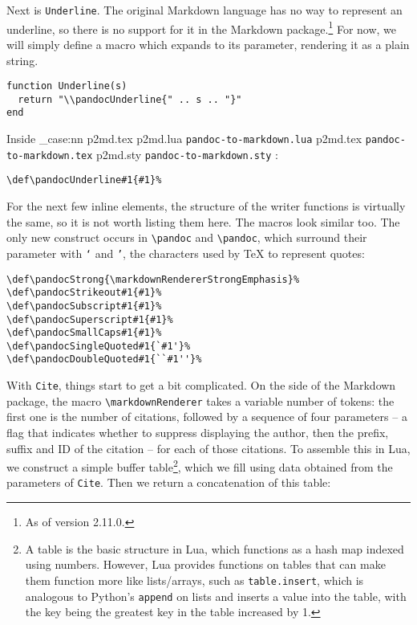 \documentclass[
  digital,     %
  oneside,     %
  nosansbold,  %
  nocolorbold, %
  lof,         %
  nolot,       %
]{fithesis4}
\newcommand\macro[1]{\texttt{\textbackslash{}{#1}}}
\newcommand\pandoc[1]{\macro{pandoc\-{#1}}}
\newcommand\renderer[1]{\macro{markdown\-Renderer\-{#1}}}
\newcommand\file[1]
  {
    \str_case:nn
      { #1 }
      {
        { p2md.lua } { \texttt{pandoc\hyp{}to\hyp{}markdown.lua} }
        { p2md.tex } { \texttt{pandoc\hyp{}to\hyp{}markdown.tex} }
        { p2md.sty } { \texttt{pandoc\hyp{}to\hyp{}markdown.sty} }
      }
  }
\begin{document}
\noindent
Next is \texttt{Underline}. The original Markdown language has no way to represent an underline, so there is no support for it in the Markdown package.\footnote{As of version 2.11.0.} For now, we will simply define a macro which expands to its parameter, rendering it as a plain string.

\noindent
\lstset{language=[5.3]Lua}
\begin{lstlisting}
function Underline(s)
  return "\\pandocUnderline{" .. s .. "}"
end
\end{lstlisting}

\noindent
Inside \file{p2md.tex}:

\noindent
\lstset{language=[plain]TeX}
\begin{lstlisting}
\def\pandocUnderline#1{#1}%
\end{lstlisting}

\noindent
For the next few inline elements, the structure of the writer functions is virtually the same, so it is not worth listing them here. The macros look similar too. The only new construct occurs in \pandoc{SingleQuoted} and \pandoc{DoubleQuoted}, which surround their parameter with \texttt{`} and \texttt{'}, the characters used by \TeX{} to represent quotes:

\noindent
\lstset{language=[plain]TeX}
\begin{lstlisting}
\def\pandocStrong{\markdownRendererStrongEmphasis}%
\def\pandocStrikeout#1{#1}%
\def\pandocSubscript#1{#1}%
\def\pandocSuperscript#1{#1}%
\def\pandocSmallCaps#1{#1}%
\def\pandocSingleQuoted#1{`#1'}%
\def\pandocDoubleQuoted#1{``#1''}%
\end{lstlisting}

\noindent
With \texttt{Cite}, things start to get a bit complicated. On the side of the Markdown package, the macro \renderer{Cite} takes a variable number of tokens: the first one is the number of citations, followed by a sequence of four parameters -- a flag that indicates whether to suppress displaying the author, then the prefix, suffix and ID of the citation -- for each of those citations. To assemble this in Lua, we construct a simple buffer table\footnote{A table is the basic structure in Lua, which functions as a hash map indexed using numbers. However, Lua provides functions on tables that can make them function more like lists/arrays, such as \texttt{table.insert}, which is analogous to Python's \texttt{append} on lists and inserts a value into the table, with the key being the greatest key in the table increased by 1.}, which we fill using data obtained from the parameters of \texttt{Cite}. Then we return a concatenation of this table:
\end{document}
